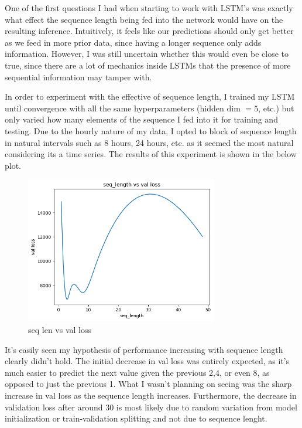 \documentclass[12pt, twoside]{report}
\begin{document}
One of the first questions I had when starting to work with LSTM's was exactly what effect
the sequence length being fed into the network would have on the resulting inference. Intuitively,
it feels like our predictions should only get better as we feed in more prior data, since having a longer
sequence only adds information. However, I was still uncertain whether this would even be close to true,
since there are a lot of mechanics inside LSTMs that the presence of more sequential information may tamper
with.

In order to experiment with the effective of sequence length, I trained my LSTM until convergence with all
the same hyperparameters (hidden dim $= 5$, etc.) but only varied how many elements of the sequence I fed into it
for training and testing. Due to the hourly nature of my data, I opted to block of sequence length in natural intervals
such as 8 hours, 24 hours, etc. as it seemed the most natural considering its a time series. The results of this 
experiment is shown in the below plot.

\begin{figure}[H]
    \centering
    \includegraphics[width=0.75\textwidth]{figures/seq len vs val loss.png}
    \caption*{seq len vs val loss}
\end{figure}

It's easily seen my hypothesis of performance increasing with sequence length clearly didn't hold.
The initial decrease in val loss was entirely expected, as it's much easier to predict the next value
given the previous 2,4, or even 8, as opposed to just the previous 1.
What I wasn't planning on seeing was the sharp increase in val loss as the sequence length increases.
Furthermore, the decrease in validation loss after around 30 is most likely due to random variation from 
model initialization or train-validation splitting and not due to sequence lenght.
\end{document}
